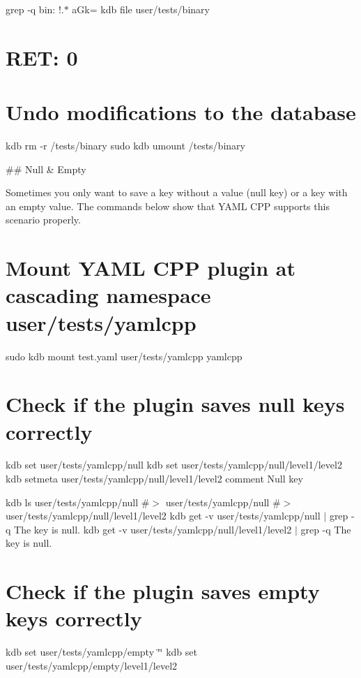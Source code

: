 grep -\/q \textquotesingle{}bin\+: !.$\ast$ a\+Gk=\textquotesingle{} {\ttfamily kdb file user/tests/binary} \section*{R\+ET\+: 0}

\section*{Undo modifications to the database}

kdb rm -\/r /tests/binary sudo kdb umount /tests/binary 
\begin{DoxyCode}
## Null & Empty

Sometimes you only want to save a key without a value (null key) or a key with an empty value. The commands
       below show that YAML CPP supports this scenario properly.
\end{DoxyCode}
 \section*{Mount Y\+A\+ML C\+PP plugin at cascading namespace {\ttfamily user/tests/yamlcpp}}

sudo kdb mount test.\+yaml user/tests/yamlcpp yamlcpp

\section*{Check if the plugin saves null keys correctly}

kdb set user/tests/yamlcpp/null kdb set user/tests/yamlcpp/null/level1/level2 kdb setmeta user/tests/yamlcpp/null/level1/level2 comment \textquotesingle{}Null key\textquotesingle{}

kdb ls user/tests/yamlcpp/null \#$>$ user/tests/yamlcpp/null \#$>$ user/tests/yamlcpp/null/level1/level2 kdb get -\/v user/tests/yamlcpp/null $\vert$ grep -\/q \textquotesingle{}The key is null.\textquotesingle{} kdb get -\/v user/tests/yamlcpp/null/level1/level2 $\vert$ grep -\/q \textquotesingle{}The key is null.\textquotesingle{}

\section*{Check if the plugin saves empty keys correctly}

kdb set user/tests/yamlcpp/empty \char`\"{}\char`\"{} kdb set user/tests/yamlcpp/empty/level1/level2

